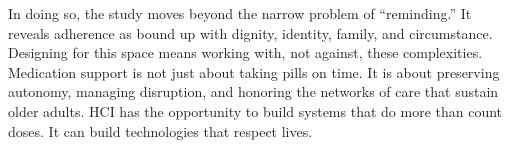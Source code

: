 \documentclass[acmlarge]{acmart}
\begin{document}
In doing so, the study moves beyond the narrow problem of ``reminding.''
It reveals adherence as bound up with dignity, identity, family, and
circumstance. Designing for this space means working with, not against,
these complexities. Medication support is not just about taking pills on
time. It is about preserving autonomy, managing disruption, and honoring
the networks of care that sustain older adults. HCI has the opportunity
to build systems that do more than count doses. It can build
technologies that respect lives.






\end{document}
